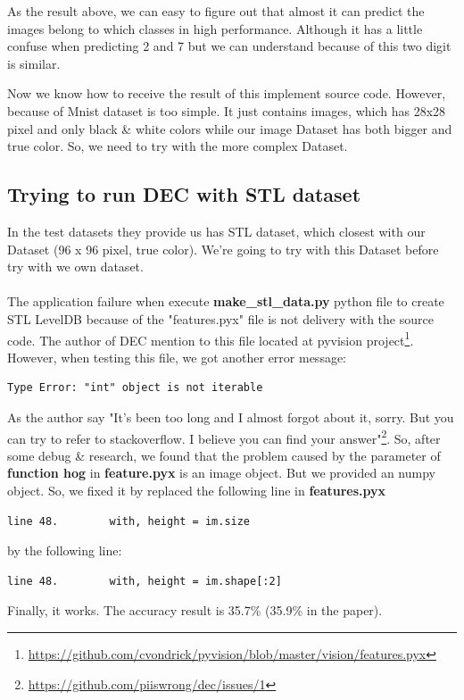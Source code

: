 \documentclass[hidelinks,12pt,a4paper]{report}
\begin{document}
As the result above, we can easy to figure out that almost it can predict the images belong to which classes in high performance. Although it has a little confuse when predicting 2 and 7 but we can understand because of this two digit is similar.

Now we know how to receive the result of this implement source code. However, because of Mnist dataset is too simple. It just contains images, which has 28x28 pixel and only black \& white colors while our image Dataset has both bigger and true color. So, we need to try with the more complex Dataset. 

\subsection{Trying to run DEC with STL dataset}
In the test datasets they provide us has STL dataset, which closest with our Dataset (96 x 96 pixel, true color). We're going to try with this Dataset before try with we own dataset.\\\\
The application failure when execute \textbf{make\_stl\_data.py} python file to create STL LevelDB because of the "features.pyx" file is not delivery with the source code. 
The author of DEC mention to this file located at pyvision project\footnote{\href{https://github.com/cvondrick/pyvision/blob/master/vision/features.pyx}{https://github.com/cvondrick/pyvision/blob/master/vision/features.pyx}}. However, when testing this file, we got another error message:
\begin{verbatim}
Type Error: "int" object is not iterable
\end{verbatim}
As the author say "It's been too long and I almost forgot about it, sorry. But you can try to refer to stackoverflow. I believe you can find your answer"\footnote{\href{https://github.com/piiswrong/dec/issues/1}{https://github.com/piiswrong/dec/issues/1}}. So, after some debug \& research, we found that the problem caused by the parameter of \textbf{function hog} in \textbf{feature.pyx} is an image object. But we provided an numpy object. So, we fixed it by replaced the following line in \textbf{features.pyx}
\begin{verbatim}
line 48. 		with, height = im.size
\end{verbatim}
by the following line:
\begin{verbatim}
line 48. 		with, height = im.shape[:2]
\end{verbatim}
Finally, it works. The accuracy result is 35.7\% (35.9\% in the paper).
\end{document}
